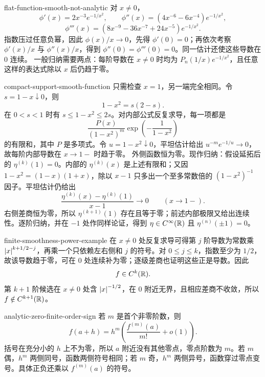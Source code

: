 \begin{solution}{flat-function-smooth-not-analytic}
对 \(x\ne0\)，
\[
 \phi'(x)=2x^{-3}e^{-1/x^2},\qquad
 \phi''(x)=(4x^{-6}-6x^{-4})e^{-1/x^2},
\]
\[
 \phi'''(x)=(8x^{-9}-36x^{-7}+24x^{-5})e^{-1/x^2}.
\]
指数压过任意负幂，因此 \(\phi(x)/x\to0\)，先得
\(\phi'(0)=0\)；再依次考察 \(\phi'(x)/x\) 与 \(\phi''(x)/x\)，得到
\(\phi''(0)=\phi'''(0)=0\)。同一估计还使这些导数在 \(0\) 连续。
一般归纳需要两点：每阶导数在 \(x\ne0\) 时均为
\(P_n(1/x)e^{-1/x^2}\)，且任意这样的表达式除以 \(x\) 后仍趋于零。
\end{solution}

\begin{solution}{compact-support-smooth-function}
只需检查 \(x=1\)，另一端完全相同。令 \(s=1-x\downarrow0\)，则
\[
 1-x^2=s(2-s).
\]
在 \(0<s<1\) 时有 \(s\le1-x^2\le2s\)。对内部公式反复求导，每一项都是
\[
 \frac{P(x)}{(1-x^2)^m}
 \exp\!\left(-\frac1{1-x^2}\right)
\]
的有限和，其中 \(P\) 是多项式。令 \(u=1-x^2\downarrow0\)，平坦估计给出
\(u^{-m}e^{-1/u}\to0\)，故每阶内部导数在 \(x\to1-\) 时趋于零。
外侧函数恒为零。现作归纳：假设延拓后的 \(\eta^{(k)}(1)=0\)。内部的 \(\eta^{(k)}(x)\) 是上述有限和；又因 \(1-x^2=(1-x)(1+x)\)，除以 \(x-1\) 只多出一个至多常数倍的 \((1-x^2)^{-1}\) 因子。平坦估计仍给出
\[
 \frac{\eta^{(k)}(x)-\eta^{(k)}(1)}{x-1}\longrightarrow0
 \qquad(x\to1-).
\]
右侧差商恒为零，所以 \(\eta^{(k+1)}(1)\) 存在且等于零；前述内部极限又给出连续性。逐阶归纳，并在 \(-1\) 处作同样论证，得到
\(\eta\in C^\infty(\mathbb{R})\) 且 \(\eta^{(n)}(\pm1)=0\)。
\end{solution}

\begin{solution}{finite-smoothness-power-example}
在 \(x\ne0\) 处反复求导可得第 \(j\) 阶导数为常数乘
\(\left|x\right|^{k+1/2-j}\)，再乘一个只依赖左右侧和 \(j\) 的符号。对
\(0\le j\le k\)，指数至少为 \(1/2\)，故该导数趋于零，可在 \(0\) 处连续补为零；逐级差商也证明这些正是导数。因此
\[
 f\in C^k(\mathbb{R}).
\]
第 \(k+1\) 阶候选在 \(x\ne0\) 处含 \(\left|x\right|^{-1/2}\)，在 \(0\) 附近无界，且相应差商不收敛，所以 \(f\notin C^{k+1}(\mathbb{R})\)。
\end{solution}

\begin{solution}{analytic-zero-finite-order-sign}
若 \(m\) 是首个非零阶数，则
\[
 f(a+h)=h^m\left(\frac{f^{(m)}(a)}{m!}+o(1)\right).
\]
括号在充分小的 \(h\) 上不为零，所以 \(a\) 附近没有其他零点，零点阶数为 \(m\)。若 \(m\) 偶，\(h^m\) 两侧同号，函数两侧符号相同；若 \(m\) 奇，\(h^m\) 两侧异号，函数穿过零点变号。具体正负还乘以 \(f^{(m)}(a)\) 的符号。
\end{solution}

